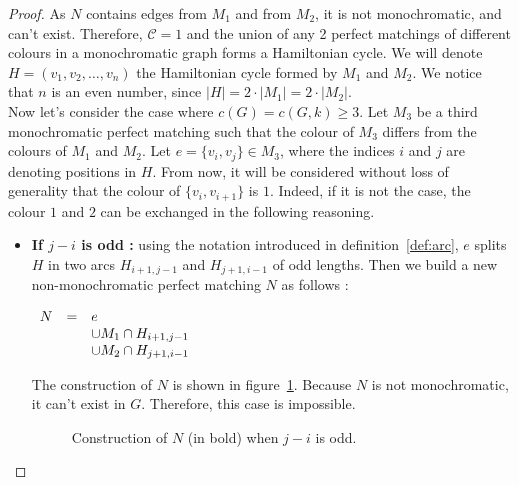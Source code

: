 \begin{proof}
    As $N$ contains edges from $M_1$ and from $M_2$, it is not monochromatic, and can't exist.
    Therefore, $\mathcal{C} = 1$ and the union of any 2 perfect matchings of different colours in a monochromatic graph forms a Hamiltonian cycle.
    We will denote $H = (v_1, v_2, \dots, v_n)$ the Hamiltonian cycle formed by $M_1$ and $M_2$.
    We notice that $n$ is an even number, since $|H| = 2 \cdot |M_1| = 2 \cdot |M_2|$.\\

    Now let's consider the case where $c(G) = c(G, k) \geq 3$.
    Let $M_3$ be a third monochromatic perfect matching such that the colour of $M_3$ differs from the colours of $M_1$ and $M_2$.
    Let $e = \{v_i, v_j\} \in M_3$, where the indices $i$ and $j$ are denoting positions in $H$.
    From now, it will be considered without loss of generality that the colour of $\{v_i, v_{i+1}\}$ is $1$.
    Indeed, if it is not the case, the colour $1$ and $2$ can be exchanged in the following reasoning.

    \begin{itemize}
        \item
            \textbf{If $j - i$ is odd :} using the notation introduced in definition~\ref{def:arc}, $e$ splits $H$ in two arcs $H_{i+1, j-1}$ and $H_{j+1, i-1}$ of odd lengths.
            Then we build a new non-monochromatic perfect matching $N$ as follows :
            
            \begin{center}
                $\begin{array}{r c l}
                    N & = & e \\
                      &   & \cup M_1 \cap H_{i+1, j-1} \\
                      &   & \cup M_2 \cap H_{j+1, i-1}
                \end{array}$
            \end{center}
            
            The construction of $N$ is shown in figure~\ref{fig:proof_simplified_odd}.
            Because $N$ is not monochromatic, it can't exist in $G$.
            Therefore, this case is impossible.
            
            \begin{figure}[H]
                \caption{Construction of $N$ (in bold) when $j - i$ is odd.}
                \label{fig:proof_simplified_odd}
            \end{figure}
            

\end{itemize}
\end{proof}
